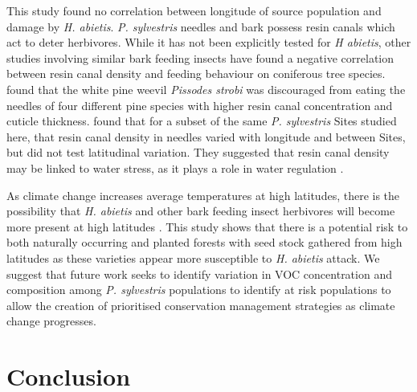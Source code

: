 \documentclass[a4paper, 11pt]{article}
\begin{document}
This study found no correlation between longitude of source population and damage by \textit{H. abietis}. \textit{P. sylvestris} needles and bark possess resin canals which act to deter herbivores. While it has not been explicitly tested for \textit{H abietis}, other studies involving similar bark feeding insects have found a negative correlation between resin canal density and feeding behaviour on coniferous tree species. \citet{Boucher2001} found that the white pine weevil \textit{Pissodes strobi} was discouraged from eating the needles of four different pine species with higher resin canal concentration and cuticle thickness. \citet{Donnelly2016} found that for a subset of the same \textit{P. sylvestris} Sites studied here, that resin canal density in needles varied with longitude and between Sites, but did not test latitudinal variation. They suggested that resin canal density may be linked to water stress, as it plays a role in water regulation \citep{Farrell1991}. 

As climate change increases average temperatures at high latitudes, there is the possibility that \textit{H. abietis} and other bark feeding insect herbivores will become more present at high latitudes \citep{Inward2012}. This study shows that there is a potential risk to both naturally occurring and planted forests with seed stock gathered from high latitudes as these varieties appear more susceptible to \textit{H. abietis} attack. We suggest that future work seeks to identify variation in VOC concentration and composition among \textit{P. sylvestris} populations to identify at risk populations to allow the creation of prioritised conservation management strategies as climate change progresses.

\section*{Conclusion}
\end{document}
